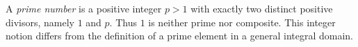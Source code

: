 
A \emph{prime number} is a positive integer $p>1$ with exactly two distinct positive divisors, namely $1$ and $p$. Thus $1$ is neither prime nor composite. This integer notion differs from the definition of a prime element in a general integral domain.

